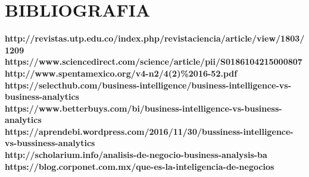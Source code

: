 \section{BIBLIOGRAFIA} 
\begin{flushleft}




\textbf {http://revistas.utp.edu.co/index.php/revistaciencia/article/view/1803/1209}\\

\textbf{https://www.sciencedirect.com/science/article/pii/S0186104215000807}\\

\textbf{http://www.spentamexico.org/v4-n2/4(2)\%2016-52.pdf}\\

\textbf{https://selecthub.com/business-intelligence/business-intelligence-vs-business-analytics}\\
\textbf{https://www.betterbuys.com/bi/business-intelligence-vs-business-analytics}\\
\textbf{https://aprendebi.wordpress.com/2016/11/30/bussiness-intelligence-vs-bussiness-analytics}\\
\textbf{http://scholarium.info/analisis-de-negocio-business-analysis-ba}\\
\textbf{https://blog.corponet.com.mx/que-es-la-inteligencia-de-negocios}\\











\textbf{}\\



\textbf{}\\

\end{flushleft}